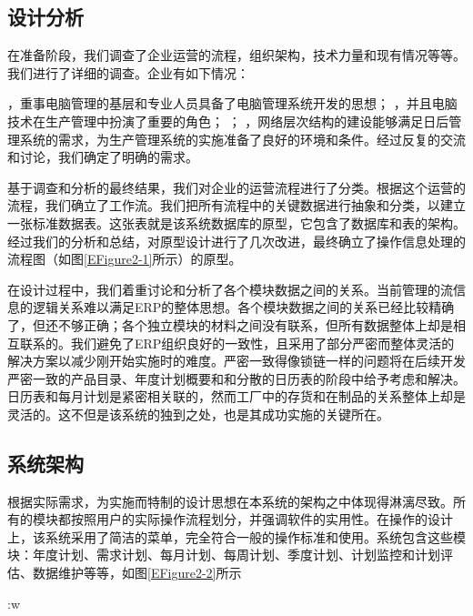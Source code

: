 \subsection{设计分析}

在准备阶段，我们调查了企业运营的流程，组织架构，技术力量和现有情况等等。我们进行了详细的调查。企业有如下情况：
\begin{itemize}
，重事电脑管理的基层和专业人员具备了电脑管理系统开发的思想；
，并且电脑技术在生产管理中扮演了重要的角色；
；
，网络层次结构的建设能够满足日后管理系统的需求，为生产管理系统的实施准备了良好的环境和条件。经过反复的交流和讨论，我们确定了明确的需求。
\end{itemize}

基于调查和分析的最终结果，我们对企业的运营流程进行了分类。根据这个运营的流程，我们确立了工作流。我们把所有流程中的关键数据进行抽象和分类，以建立一张标准数据表。这张表就是该系统数据库的原型，它包含了数据库和表的架构。经过我们的分析和总结，对原型设计进行了几次改进，最终确立了操作信息处理的流程图（如图\ref{EFigure2-1}所示）的原型。

        
在设计过程中，我们着重讨论和分析了各个模块数据之间的关系。当前管理的流信息的逻辑关系难以满足ERP的整体思想。各个模块数据之间的关系已经比较精确了，但还不够正确；各个独立模块的材料之间没有联系，但所有数据整体上却是相互联系的。我们避免了ERP组织良好的一致性，且采用了部分严密而整体灵活的解决方案以减少刚开始实施时的难度。严密一致得像锁链一样的问题将在后续开发严密一致的产品目录、年度计划概要和和分散的日历表的阶段中给予考虑和解决。日历表和每月计划是紧密相关联的，然而工厂中的存货和在制品的关系整体上却是灵活的。这不但是该系统的独到之处，也是其成功实施的关键所在。

\subsection{系统架构}

根据实际需求，为实施而特制的设计思想在本系统的架构之中体现得淋漓尽致。所有的模块都按照用户的实际操作流程划分，并强调软件的实用性。在操作的设计上，该系统采用了简洁的菜单，完全符合一般的操作标准和使用。系统包含这些模块：年度计划、需求计划、每月计划、每周计划、季度计划、计划监控和计划评估、数据维护等等，如图\ref{EFigure2-2}所示

:w

